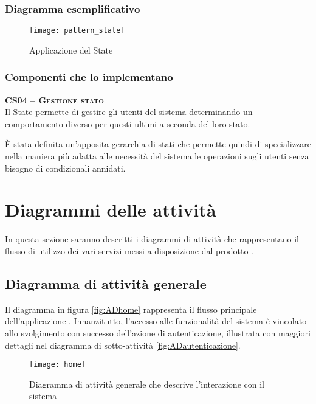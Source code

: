 \subsubsection{Diagramma esemplificativo}
\begin{figure}[H]
  \centering
  \texttt{[image: pattern\_state]}
  \caption{Applicazione del  State}\label{fig:state}
\end{figure}

\subsubsection{Componenti che lo implementano}
\begin{description}
\item{\scshape\bfseries CS04 -- Gestione stato}\\
Il  State permette di gestire gli utenti del sistema determinando un comportamento diverso per questi ultimi a seconda del loro stato.

È stata definita un'apposita gerarchia di stati che permette quindi di specializzare nella maniera più adatta alle necessità del sistema le operazioni sugli utenti senza bisogno di condizionali annidati.
\end{description}
\clearpage

\section{Diagrammi delle attività}
In questa sezione saranno descritti i diagrammi di attività che rappresentano il flusso di utilizzo dei vari servizi messi a disposizione dal prodotto \caName.

\subsection{Diagramma di attività generale}

Il diagramma in figura \vref{fig:ADhome} rappresenta il flusso principale dell'applicazione \caName. Innanzitutto, l'accesso alle funzionalità del sistema è vincolato allo svolgimento con successo dell'azione di autenticazione, illustrata con maggiori dettagli nel diagramma di sotto-attività \vref{fig:ADautenticazione}.

\begin{figure}[H]
\centering
\texttt{[image: home]}
\caption{Diagramma di attività generale che descrive l'interazione con il sistema}\label{fig:ADhome}
\end{figure}

